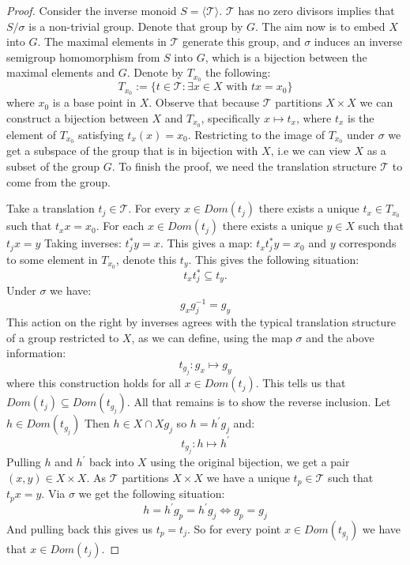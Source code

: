 \begin{corollary}
\begin{proof}
Consider the inverse monoid $S = \langle \mathcal{T} \rangle$. $\mathcal{T}$ has no zero divisors implies that $S/\sigma$ is a non-trivial group. Denote that group by $G$. The aim now is to embed $X$ into $G$. The maximal elements in $\mathcal{T}$ generate this group, and $\sigma$ induces an inverse semigroup homomorphism from $S$ into $G$, which is a bijection between the maximal elements and $G$. Denote by $T_{x_{0}}$ the following:
\begin{equation}
T_{x_{0}} := \lbrace t \in \mathcal{T} : \exists x \in X \mbox{ with } tx=x_{0} \rbrace
\end{equation}
where $x_{0}$ is a base point in $X$. Observe that because $\mathcal{T}$ partitions $X \times X$ we can construct a bijection between $X$ and $T_{x_{0}}$, specifically $x \mapsto t_{x}$, where $t_{x}$ is the element of $T_{x_{0}}$ satisfying $t_{x}(x)=x_{0}$. Restricting to the image of $T_{x_{0}}$ under $\sigma$ we get a subspace of the group that is in bijection with $X$, i.e we can view $X$ as a subset of the group $G$. To finish the proof, we need the translation structure $\mathcal{T}$ to come from the group.

Take a translation $t_{j} \in \mathcal{T}$. For every $x \in Dom(t_{j})$ there exists a unique $t_{x} \in T_{x_{0}}$ such that $t_{x}x=x_{0}$. For each $x \in Dom(t_{j})$ there exists a unique $y \in X$ such that $t_{j}x=y$ Taking inverses: $t_{j}^{*}y=x$. This gives a map: $t_{x}t_{j}^{*}y=x_{0}$ and $y$ corresponds to some element in $T_{x_{0}}$, denote this $t_{y}$. This gives the following situation:
\begin{equation}
t_{x}t_{j}^{*} \subseteq t_{y}.
\end{equation} 
Under $\sigma$ we have:
\begin{equation}
g_{x}g_{j}^{-1}=g_{y}
\end{equation}
This action on the right by inverses agrees with the typical translation structure of a group restricted to $X$, as we can define, using the map $\sigma$ and the above information:
\begin{equation}
t_{g_{j}}:g_{x} \mapsto g_{y}
\end{equation}
where this construction holds for all $x\in Dom(t_{j})$. This tells us that $Dom(t_{j}) \subseteq Dom(t_{g_{j}})$. All that remains is to show the reverse inclusion. Let $h \in Dom(t_{g_{j}})$ Then $h \in X \cap Xg_{j}$ so $h=h^{'}g_{j}$ and:
\begin{equation}
t_{g_{j}}:h \mapsto h^{'}
\end{equation}
Pulling $h$ and $h^{'}$ back into $X$ using the original bijection, we get a pair $(x,y) \in X \times X$. As $\mathcal{T}$ partitions $X\times X$ we have a unique $t_{p} \in \mathcal{T}$ such that $t_{p}x=y$. Via $\sigma$ we get the following situation:
\begin{equation}
h=h^{'}g_{p}=h^{'}g_{j} \Leftrightarrow g_{p}=g_{j}
\end{equation}
And pulling back this gives us $t_{p}=t_{j}$. So for every point $x\in Dom(t_{g_{j}})$ we have that $x \in Dom(t_{j})$.


\end{proof}
\end{corollary}
